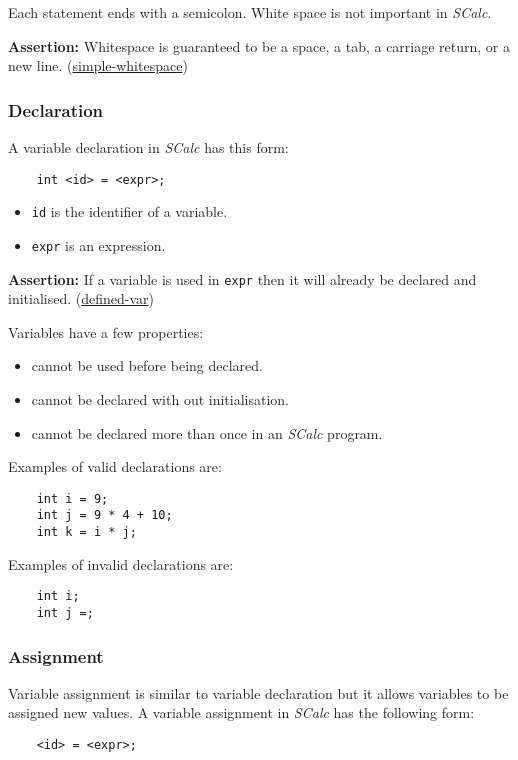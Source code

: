 \documentclass{article}
\newcommand{\code}[1]{\texttt{\textmd{#1}}}
\newcommand{\assertion}[2]{\textbf{Assertion: }#1 (\hyperlink{#2}{#2})}
\begin{document}
Each statement ends with a semicolon. White space is not important in \textit{SCalc}.

\assertion{Whitespace is guaranteed to be a space, a tab, a carriage return, or a new
line.}{simple-whitespace}

\subsubsection{Declaration}
\label{sssec:declaration}

A variable declaration in \textit{SCalc} has this form:
\begin{lstlisting}
	int <id> = <expr>;
\end{lstlisting}

\begin{itemize}
	\item \code{id} is the identifier of a variable.
	\item \code{expr} is an expression.
\end{itemize}

\assertion{If a variable is used in \code{expr} then it will already be declared and initialised.}
{defined-var}

Variables have a few properties:
\begin{itemize}
  \item cannot be used before being declared.
  \item cannot be declared with out initialisation.
  \item cannot be declared more than once in an \textit{SCalc} program.
\end{itemize}

Examples of valid declarations are:
\begin{lstlisting}
	int i = 9;
	int j = 9 * 4 + 10;
	int k = i * j;
\end{lstlisting}

Examples of invalid declarations are:
\begin{lstlisting}
	int i;
	int j =;
\end{lstlisting}

\subsubsection{Assignment}
\label{sssec:assignment}
Variable assignment is similar to variable declaration but it allows variables to be assigned new
values. A variable assignment in \textit{SCalc} has the following form:
\begin{lstlisting}
	<id> = <expr>;
\end{lstlisting}
\end{document}
